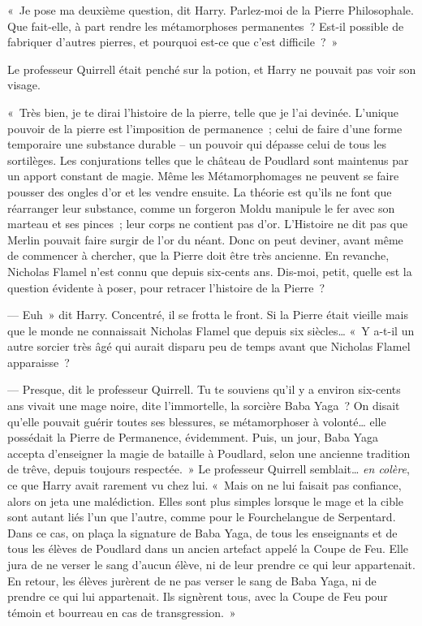 «~Je pose ma deuxième question, dit Harry. Parlez-moi de la Pierre Philosophale. Que fait-elle, à part rendre les métamorphoses permanentes~? Est-il possible de fabriquer d'autres pierres, et pourquoi est-ce que c'est difficile~?~»

Le professeur Quirrell était penché sur la potion, et Harry ne pouvait pas voir son visage.

«~Très bien, je te dirai l'histoire de la pierre, telle que je l'ai devinée. L'unique pouvoir de la pierre est l'imposition de permanence~; celui de faire d'une forme temporaire une substance durable -- un pouvoir qui dépasse celui de tous les sortilèges. Les conjurations telles que le château de Poudlard sont maintenus par un apport constant de magie. Même les Métamorphomages ne peuvent se faire pousser des ongles d'or et les vendre ensuite. La théorie est qu'ils ne font que réarranger leur substance, comme un forgeron Moldu manipule le fer avec son marteau et ses pinces~; leur corps ne contient pas d'or. L'Histoire ne dit pas que Merlin pouvait faire surgir de l'or du néant. Donc on peut deviner, avant même de commencer à chercher, que la Pierre doit être très ancienne. En revanche, Nicholas Flamel n'est connu que depuis six-cents ans. Dis-moi, petit, quelle est la question évidente à poser, pour retracer l'histoire de la Pierre~?

--- Euh~» dit Harry. Concentré, il se frotta le front. Si la Pierre était vieille mais que le monde ne connaissait Nicholas Flamel que depuis six siècles… «~Y a-t-il un autre sorcier très âgé qui aurait disparu peu de temps avant que Nicholas Flamel apparaisse~?

--- Presque, dit le professeur Quirrell. Tu te souviens qu'il y a environ six-cents ans vivait une mage noire, dite l'immortelle, la sorcière Baba Yaga~? On disait qu'elle pouvait guérir toutes ses blessures, se métamorphoser à volonté… elle possédait la Pierre de Permanence, évidemment. Puis, un jour, Baba Yaga accepta d'enseigner la magie de bataille à Poudlard, selon une ancienne tradition de trêve, depuis toujours respectée.~» Le professeur Quirrell semblait… \emph{en colère}, ce que Harry avait rarement vu chez lui. «~Mais on ne lui faisait pas confiance, alors on jeta une malédiction. Elles sont plus simples lorsque le mage et la cible sont autant liés l'un que l'autre, comme pour le Fourchelangue de Serpentard. Dans ce cas, on plaça la signature de Baba Yaga, de tous les enseignants et de tous les élèves de Poudlard dans un ancien artefact appelé la Coupe de Feu. Elle jura de ne verser le sang d'aucun élève, ni de leur prendre ce qui leur appartenait. En retour, les élèves jurèrent de ne pas verser le sang de Baba Yaga, ni de prendre ce qui lui appartenait. Ils signèrent tous, avec la Coupe de Feu pour témoin et bourreau en cas de transgression.~»

